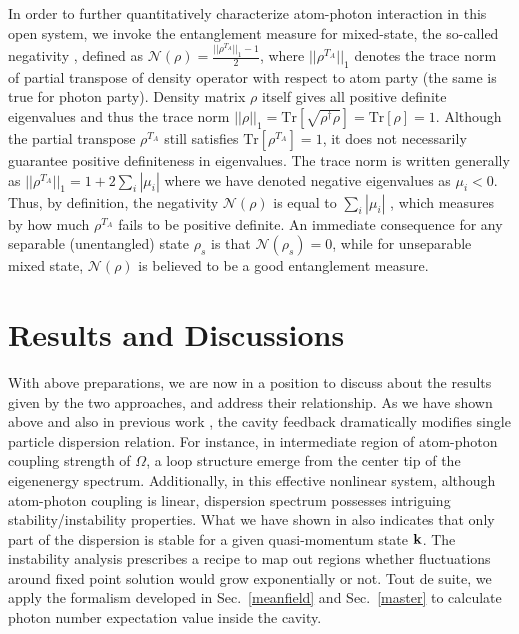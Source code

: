 \documentclass[atoms,article,submit,moreauthors,pdftex,12pt,a4paper]{mdpi}
\begin{document}
In order to further quantitatively characterize atom-photon interaction in this open system, we invoke the entanglement measure for mixed-state, the so-called negativity \cite{negativity}, defined as $\mathcal{N}(\rho)=\frac{||\rho^{T_A}||_1-1}{2}$, where $||\rho^{T_A}||_1$ denotes the trace norm of partial transpose of density operator with respect to atom party (the same is true for photon party). Density matrix $\rho$ itself gives all positive definite eigenvalues and thus the trace norm $||\rho||_1=\text{Tr}[\sqrt{\rho^\dagger\rho}]=\text{Tr}[\rho]=1$. Although the partial transpose $\rho^{T_A}$ still satisfies $\text{Tr}[\rho^{T_A}]=1$, it does not necessarily guarantee positive definiteness in eigenvalues. The trace norm is written generally as $||\rho^{T_A}||_1=1+2\sum_i|\mu_i|$ where we have denoted negative eigenvalues as $\mu_i<0$. Thus, by definition, the negativity $\mathcal{N}(\rho)$ is equal to $\sum_i|\mu_i|$ 
, which measures by how much $\rho^{T_A}$ fails to be positive definite. An immediate consequence for any separable (unentangled) state $\rho_s$ is that $\mathcal{N}(\rho_s)=0$, while for unseparable mixed state, $\mathcal{N}(\rho)$ is believed to be a good entanglement measure. 

\section{Results and Discussions} \label{relation}

With above preparations, we are now in a position to discuss about the results given by the two approaches, and address their relationship. As we have shown above and also in previous work \cite{cavitySOC}, the cavity feedback dramatically modifies single particle dispersion relation. For instance, in intermediate region of atom-photon coupling strength of $\Omega$, a loop structure emerge from the center tip of the eigenenergy spectrum. Additionally, in this effective nonlinear system, although atom-photon coupling is linear, dispersion spectrum possesses intriguing stability/instability properties. What we have shown in \cite{cavitySOC} also indicates that only part of the dispersion is stable for a given quasi-momentum state ${\bf k}$. The instability analysis prescribes a recipe to map out regions whether fluctuations around fixed point solution would grow exponentially or not. Tout de suite, we apply the formalism developed in Sec.~\ref{meanfield} and Sec.~\ref{master} to calculate photon number expectation value inside the cavity.
\end{document}
